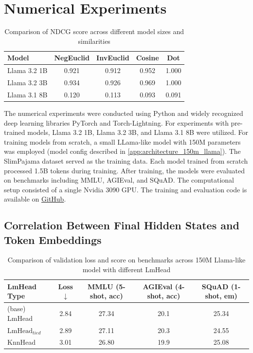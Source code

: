 \chapter{Numerical Experiments}

\begin{table}[h]
    \centering
    \caption{Comparison of NDCG score across different model sizes and similarities}
    \begin{tabular}{lcccc}
    \toprule
    Model & NegEuclid & InvEuclid & Cosine & Dot \\
    \midrule
    Llama 3.2 1B & 0.921 & 0.912  & 0.952 & 1.000 \\
    Llama 3.2 3B & 0.934 & 0.926  & 0.969 & 1.000 \\
    Llama 3.1 8B & 0.120 & 0.113  & 0.093 & 0.091 \\
    \bottomrule
    \end{tabular}
    \label{tab:pretrained_last_hidden_scores}
\end{table}

The numerical experiments were conducted using Python and widely recognized deep learning libraries PyTorch\cite{torch} and Torch-Lightning\cite{torch-lightning}. For experiments with pre-trained models, Llama 3.2 1B, Llama 3.2 3B, and Llama 3.1 8B \cite{llama32} were utilized. For training models from scratch, a small LLama-like model with 150M parameters was employed (model config described in \ref{app:architecture_150m_llama}). The SlimPajama dataset \cite{slimpajama} served as the training data. Each model trained from scratch processed 1.5B tokens during training. After training, the models were evaluated on benchmarks including MMLU\cite{mmlu}, AGIEval\cite{agieval}, and SQuAD\cite{SQuAD}. The computational setup consisted of a single Nvidia 3090 GPU. The training and evaluation code is available on \href{https://github.com/PavelShtykov/research_tad}{GitHub}.

\section{Correlation Between Final Hidden States and Token Embeddings}

\begin{table}[h!]
    \centering
    \caption{Comparison of validation loss and score on benchmarks across 150M Llama-like model with different LmHead}
    \begin{tabular}{lcccc}
    \toprule
    LmHead Type & Loss $\downarrow$ & MMLU (5-shot, acc) & AGIEval (4-shot, acc) & SQuAD (1-shot, em) \\
    \midrule
    (base) LmHead           & 2.84 & 27.34  & 20.1 & 25.34 \\
    $\text{LmHead}_{tied}$  & 2.89 & 27.11  & 20.3 & 24.55 \\
    KnnHead                 & 3.01 & 26.80  & 19.9 & 25.08 \\
    \bottomrule
    \end{tabular}
    \label{tab:scratch_last_hidden_scores}
\end{table}


